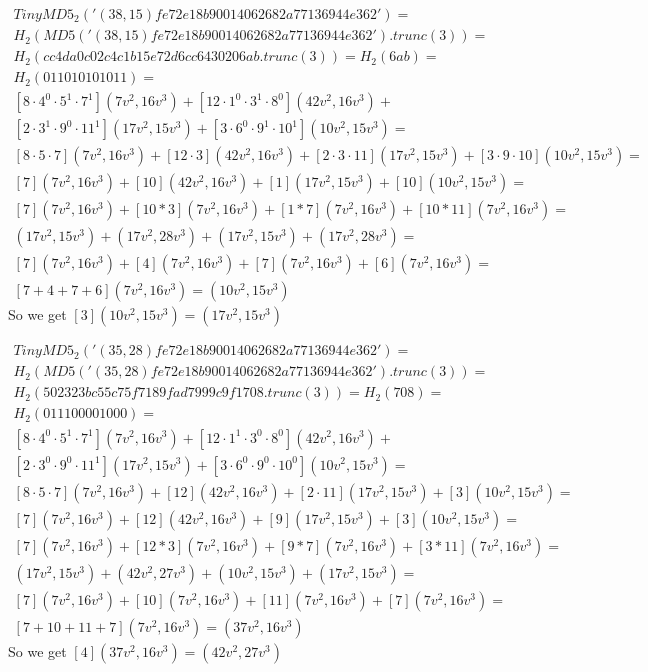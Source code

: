 \begin{example}
\begin{align*}
TinyMD5_{2}('(38,15)fe72e18b90014062682a77136944e362') =\\ H_2(MD5('(38,15)fe72e18b90014062682a77136944e362').trunc(3))=\\ H_2(cc4da0c02c4c1b15e72d6cc6430206ab.trunc(3))= H_2(6ab) = \\
H_2(011 010 101 011)=\\
[8\cdot 4^{0}\cdot 5^{1}\cdot 7^{1}](7v^2 , 16v^3)+
[12\cdot 1^{0}\cdot 3^{1}\cdot 8^{0}](42v^2 , 16v^3 )+\\
[2\cdot 3^{1}\cdot 9^{0}\cdot 11^{1}](17v^2 , 15v^3 ) +
[3\cdot 6^{0}\cdot 9^{1}\cdot 10^{1}](10v^2 , 15v^3 )= \\
[8\cdot 5\cdot 7](7v^2 , 16v^3)+
[12\cdot 3](42v^2 , 16v^3 )+
[2\cdot 3\cdot 11](17v^2 , 15v^3 ) +
[3\cdot 9\cdot 10](10v^2 , 15v^3 )= \\
[7](7v^2 , 16v^3)+
[10](42v^2 , 16v^3 )+
[1](17v^2 , 15v^3 ) +
[10](10v^2 , 15v^3 )= \\
[7](7v^2 , 16v^3)+
[10*3](7v^2 , 16v^3 )+
[1*7](7v^2 , 16v^3 ) +
[10*11](7v^2 , 16v^3 )=\\
(17v^2 , 15v^3)+
(17v^2 , 28v^3 )+
(17v^2 , 15v^3 ) +
(17v^2 , 28v^3 )=\\
[7](7v^2 , 16v^3)+
[4](7v^2 , 16v^3 )+
[7](7v^2 , 16v^3 ) +
[6](7v^2 , 16v^3 )=\\
[7+4+7+6](7v^2 , 16v^3)=
(10v^2 , 15v^3)
\end{align*}
So we get $[3](10v^2 , 15v^3 )= (17v^2 , 15v^3 )$

\begin{align*}
TinyMD5_{2}('(35,28)fe72e18b90014062682a77136944e362') =\\ H_2(MD5('(35,28)fe72e18b90014062682a77136944e362').trunc(3))=\\ H_2(502323bc55c75f7189fad7999c9f1708.trunc(3))= H_2(708) = \\
H_2(011 100 001 000)=\\
[8\cdot 4^{0}\cdot 5^{1}\cdot 7^{1}](7v^2 , 16v^3)+
[12\cdot 1^{1}\cdot 3^{0}\cdot 8^{0}](42v^2 , 16v^3 )+\\
[2\cdot 3^{0}\cdot 9^{0}\cdot 11^{1}](17v^2 , 15v^3 ) +
[3\cdot 6^{0}\cdot 9^{0}\cdot 10^{0}](10v^2 , 15v^3 )= \\
[8\cdot 5\cdot 7](7v^2 , 16v^3)+
[12](42v^2 , 16v^3 )+
[2\cdot 11](17v^2 , 15v^3 ) +
[3](10v^2 , 15v^3 )= \\
[7](7v^2 , 16v^3)+
[12](42v^2 , 16v^3 )+
[9](17v^2 , 15v^3 ) +
[3](10v^2 , 15v^3 )= \\
[7](7v^2 , 16v^3)+
[12*3](7v^2 , 16v^3 )+
[9*7](7v^2 , 16v^3 ) +
[3*11](7v^2 , 16v^3 )=\\
(17v^2 , 15v^3)+
(42v^2 , 27v^3 )+
(10v^2 , 15v^3 ) +
(17v^2 , 15v^3 )=\\
[7](7v^2 , 16v^3)+
[10](7v^2 , 16v^3 )+
[11](7v^2 , 16v^3 ) +
[7](7v^2 , 16v^3 )=\\
[7+10+11+7](7v^2 , 16v^3)=
(37v^2 , 16v^3)
\end{align*}
So we get $[4](37v^2 , 16v^3 )= (42v^2 , 27v^3 )$


\end{example}
